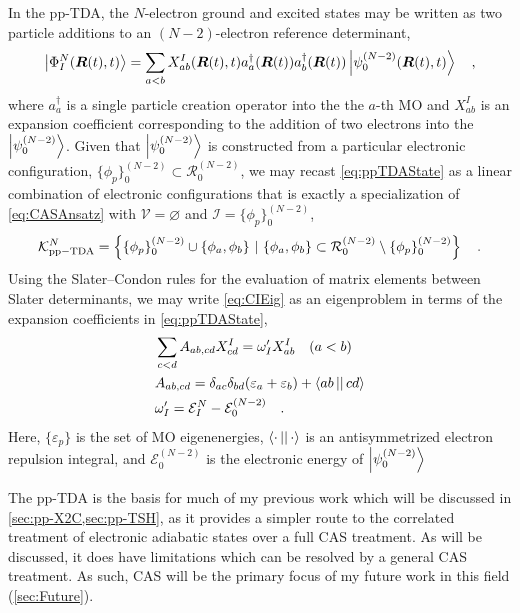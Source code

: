 In the pp-TDA, the $N$-electron ground and excited states may be written as two
particle additions to an $(N-2)$-electron reference determinant,
\begin{equation}
\left\vert \Phi_I^N (\boldsymbol{R}(t),t) \right\rangle = \sum_{a < b} X_{ab}^I(\boldsymbol{R}(t),t)
a_a^\dagger(\boldsymbol{R}(t)) a_b^\dagger (\boldsymbol{R}(t))
\left\vert \psi_0^{(N-2)}(\boldsymbol{R}(t),t) \right\rangle \quad, \label{eq:ppTDAState}
\end{equation}
where $a_a^\dagger$ is a single particle creation operator into the the $a$-th
MO and $X_{ab}^I$ is an expansion coefficient corresponding to the addition of
two electrons into the $\left\vert \psi_0^{(N-2)} \right\rangle$. Given that $\left\vert \psi_0^{(N-2)} \right\rangle$ is
constructed from a particular electronic configuration, $\{ \phi_p \}^{(N-2)}_0
\subset \mathcal{R}^{(N-2)}_0$, we may recast \cref{eq:ppTDAState} as a linear
combination of electronic configurations that is exactly a specialization of
\cref{eq:CASAnsatz} with $\mathcal{V} = \varnothing$ and $\mathcal{I} = \{
\phi_p \}^{(N-2)}_0$,
\begin{equation}
\mathcal{K}_\mathrm{pp-TDA}^N =
\left\lbrace \{ \phi_p \}^{(N-2)}_0 \cup \{\phi_a,\phi_b \} \text{ }\vert\text{ } 
\{ \phi_a,\phi_b \} \subset \mathcal{R}^{(N-2)}_0 \setminus \{\phi_p \}^{(N-2)}_0 
\right\rbrace \quad.
\end{equation}
Using the Slater--Condon rules for the evaluation of matrix elements between
Slater determinants\cite{Szabo}, we may write \cref{eq:CIEig} as an eigenproblem
in terms of the expansion coefficients in \cref{eq:ppTDAState},
\begin{align}
&\sum_{c < d} A_{ab,cd} X_{cd}^I = \omega'_I X_{ab}^I \quad (a < b)
\label{eq:ppTDAEig}\\
&A_{ab,cd} = \delta_{ac}\delta_{bd}(\varepsilon_a + \varepsilon_b) + 
  \left\langle ab \left\vert  \right\vert cd \right\rangle \\
&\omega'_I = \mathcal{E}^{N}_I - \mathcal{E}^{(N-2)}_0
\quad.
\end{align}
Here, $\{\varepsilon_p\}$ is the set of MO eigenenergies,
$\left\langle \cdot \left\vert  \right\vert \cdot \right\rangle$ is an antisymmetrized electron repulsion integral,
and $\mathcal{E}_0^{(N-2)}$ is the electronic energy of $\left\vert \psi_0^{(N-2)} \right\rangle$

The pp-TDA is the basis for much of my previous work which will be discussed in
\cref{sec:pp-X2C,sec:pp-TSH}, as it provides a simpler route to the correlated
treatment of electronic adiabatic states over a full CAS treatment. As will be
discussed, it does have limitations which can be resolved by a general CAS
treatment. As such, CAS will be the primary focus of my future work in this
field (\cref{sec:Future}).
